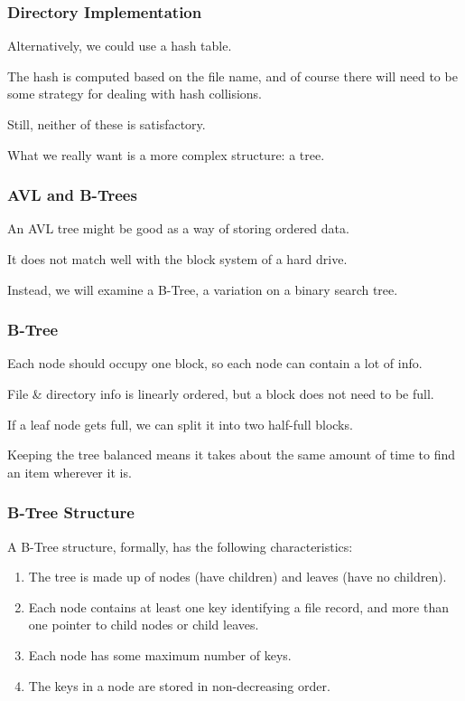 \begin{frame}
\frametitle{Directory Implementation}

Alternatively, we could use a hash table. 

The hash is computed based on the file name, and of course there will need to be some strategy for dealing with hash collisions. 

Still, neither of these is satisfactory. 

What we really want is a more complex structure: a tree.


\end{frame}

\begin{frame}
\frametitle{AVL and B-Trees}


An AVL tree might be good as a way of storing ordered data. 

It does not match well with the block system of a hard drive. 

Instead, we will examine a B-Tree, a variation on a binary search tree. 


\end{frame}

\begin{frame}
\frametitle{B-Tree}

Each node should occupy one block, so each node can contain a lot of info. 

File \& directory info is linearly ordered, but a block does not need to be full. 

If a leaf node gets full, we can split it into two half-full blocks. 

Keeping the tree balanced means it takes about the same amount of time to find an item wherever it is.


\end{frame}

\begin{frame}
\frametitle{B-Tree Structure}

A B-Tree structure, formally, has the following characteristics:

\begin{enumerate}
	\item The tree is made up of nodes (have children) and leaves (have no children).
	\item Each node contains at least one key identifying a file record, and more than one pointer to child nodes or child leaves.
	\item Each node has some maximum number of keys.
	\item The keys in a node are stored in non-decreasing order.
\end{enumerate}

\end{frame}




